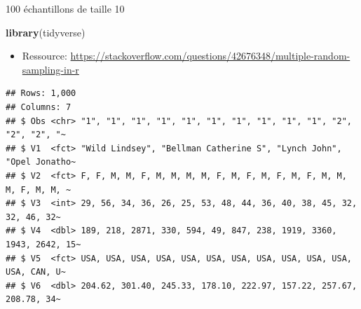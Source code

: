 \documentclass[ignorenonframetext,]{beamer}
\newenvironment{Shaded}{\begin{snugshade}}{\end{snugshade}}
\newcommand{\KeywordTok}[1]{\textcolor[rgb]{0.13,0.29,0.53}{\textbf{#1}}}
\newcommand{\DataTypeTok}[1]{\textcolor[rgb]{0.13,0.29,0.53}{#1}}
\newcommand{\DecValTok}[1]{\textcolor[rgb]{0.00,0.00,0.81}{#1}}
\newcommand{\StringTok}[1]{\textcolor[rgb]{0.31,0.60,0.02}{#1}}
\newcommand{\OtherTok}[1]{\textcolor[rgb]{0.56,0.35,0.01}{#1}}
\newcommand{\OperatorTok}[1]{\textcolor[rgb]{0.81,0.36,0.00}{\textbf{#1}}}
\newcommand{\NormalTok}[1]{#1}
\providecommand{\tightlist}{%
  \setlength{\itemsep}{0pt}\setlength{\parskip}{0pt}}
\begin{document}
\begin{frame}[fragile]{100 échantillons de taille 10}

\begin{Shaded}
\begin{Highlighting}[]
\KeywordTok{library}\NormalTok{(tidyverse)}
\end{Highlighting}
\end{Shaded}

\begin{itemize}
\tightlist
\item
  Ressource:
  \url{https://stackoverflow.com/questions/42676348/multiple-random-sampling-in-r}
\end{itemize}

\begin{Shaded}
\end{Shaded}

\begin{verbatim}
## Rows: 1,000
## Columns: 7
## $ Obs <chr> "1", "1", "1", "1", "1", "1", "1", "1", "1", "1", "2", "2", "2", "~
## $ V1  <fct> "Wild Lindsey", "Bellman Catherine S", "Lynch John", "Opel Jonatho~
## $ V2  <fct> F, F, M, M, F, M, M, M, M, F, M, F, M, F, M, F, M, M, M, F, M, M, ~
## $ V3  <int> 29, 56, 34, 36, 26, 25, 53, 48, 44, 36, 40, 38, 45, 32, 32, 46, 32~
## $ V4  <dbl> 189, 218, 2871, 330, 594, 49, 847, 238, 1919, 3360, 1943, 2642, 15~
## $ V5  <fct> USA, USA, USA, USA, USA, USA, USA, USA, USA, USA, USA, USA, CAN, U~
## $ V6  <dbl> 204.62, 301.40, 245.33, 178.10, 222.97, 157.22, 257.67, 208.78, 34~
\end{verbatim}

\end{frame}
\end{document}
